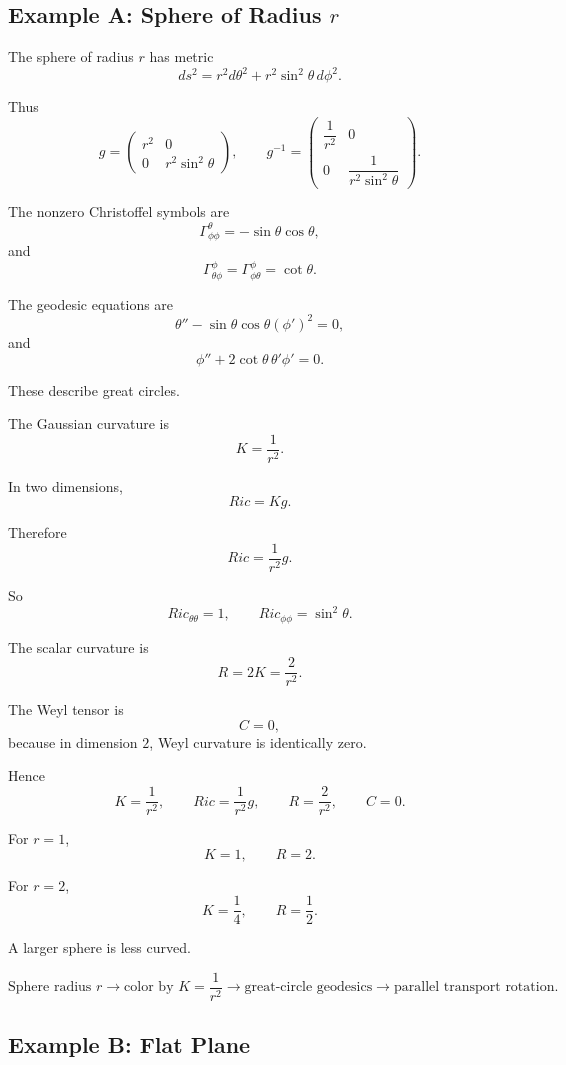 \documentclass[12pt,a4paper]{article}
\theoremstyle{notespace}
\begin{document}
\subsection{Example A: Sphere of Radius \(r\)}

The sphere of radius \(r\) has metric
\[
ds^2=r^2d\theta^2+r^2\sin^2\theta\,d\phi^2.
\]

Thus
\[
g=
\begin{pmatrix}
	r^2&0\\
	0&r^2\sin^2\theta
\end{pmatrix},
\qquad
g^{-1}
=
\begin{pmatrix}
	\dfrac1{r^2}&0\\
	0&\dfrac1{r^2\sin^2\theta}
\end{pmatrix}.
\]

The nonzero Christoffel symbols are
\[
\Gamma^\theta_{\phi\phi}
=
-\sin\theta\cos\theta,
\]
and
\[
\Gamma^\phi_{\theta\phi}
=
\Gamma^\phi_{\phi\theta}
=
\cot\theta.
\]

The geodesic equations are
\[
\theta''
-
\sin\theta\cos\theta(\phi')^2
=0,
\]
and
\[
\phi''
+
2\cot\theta\,\theta'\phi'
=0.
\]

These describe great circles.

The Gaussian curvature is
\[
K=\frac1{r^2}.
\]

In two dimensions,
\[
Ric=Kg.
\]

Therefore
\[
Ric=\frac1{r^2}g.
\]

So
\[
Ric_{\theta\theta}=1,
\qquad
Ric_{\phi\phi}=\sin^2\theta.
\]

The scalar curvature is
\[
R=2K=\frac2{r^2}.
\]

The Weyl tensor is
\[
C=0,
\]
because in dimension \(2\), Weyl curvature is identically zero.

Hence
\[
\boxed{
	K=\frac1{r^2},
	\qquad
	Ric=\frac1{r^2}g,
	\qquad
	R=\frac2{r^2},
	\qquad
	C=0.
}
\]

For \(r=1\),
\[
K=1,
\qquad
R=2.
\]

For \(r=2\),
\[
K=\frac14,
\qquad
R=\frac12.
\]

A larger sphere is less curved.

\[
\text{Sphere radius }r
\longrightarrow
\text{color by }K=\frac1{r^2}
\longrightarrow
\text{great-circle geodesics}
\longrightarrow
\text{parallel transport rotation}.
\]

\subsection{Example B: Flat Plane}
\end{document}
